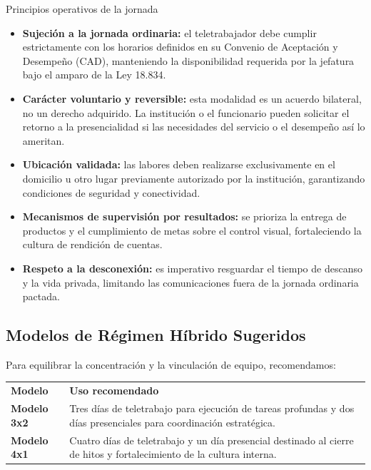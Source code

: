 \documentclass[11pt,letterpaper]{article}
\newcommand{\strong}[1]{\textbf{\textcolor{AzulProfundo}{#1}}}
\begin{document}
\begin{KeyBox}{Principios operativos de la jornada}
\begin{itemize}
    \item \strong{Sujeción a la jornada ordinaria:} el teletrabajador debe cumplir estrictamente con los horarios definidos en su Convenio de Aceptación y Desempeño (CAD), manteniendo la disponibilidad requerida por la jefatura bajo el amparo de la Ley 18.834.
    \item \strong{Carácter voluntario y reversible:} esta modalidad es un acuerdo bilateral, no un derecho adquirido. La institución o el funcionario pueden solicitar el retorno a la presencialidad si las necesidades del servicio o el desempeño así lo ameritan.
    \item \strong{Ubicación validada:} las labores deben realizarse exclusivamente en el domicilio u otro lugar previamente autorizado por la institución, garantizando condiciones de seguridad y conectividad.
    \item \strong{Mecanismos de supervisión por resultados:} se prioriza la entrega de productos y el cumplimiento de metas sobre el control visual, fortaleciendo la cultura de rendición de cuentas.
    \item \strong{Respeto a la desconexión:} es imperativo resguardar el tiempo de descanso y la vida privada, limitando las comunicaciones fuera de la jornada ordinaria pactada.
\end{itemize}
\end{KeyBox}

\subsection*{Modelos de Régimen Híbrido Sugeridos}

Para equilibrar la concentración y la vinculación de equipo, recomendamos:

\begin{tabularx}{\textwidth}{L{0.22\textwidth} Y}
\color{BlancoIndustrial}\textbf{Modelo} & \color{BlancoIndustrial}\textbf{Uso recomendado} \\
\textbf{Modelo 3x2} & Tres días de teletrabajo para ejecución de tareas profundas y dos días presenciales para coordinación estratégica. \\
\textbf{Modelo 4x1} & Cuatro días de teletrabajo y un día presencial destinado al cierre de hitos y fortalecimiento de la cultura interna. \\
\end{tabularx}
\end{document}
